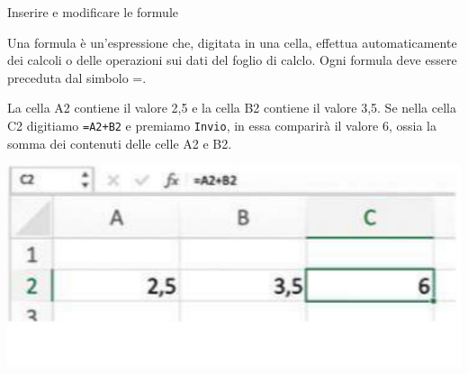 \documentclass[12pt,a4paper,oneside]{book}
\makeatletter
\newcounter{testexample} %
\renewcommand{\subsection}{\@startsection {subsection}{2}{\z@}
{-3ex \@plus -0.1ex \@minus -.4ex}
{0.5ex \@plus.2ex }
{\color[rgb]{0.141,0.596,0.749}\normalfont\sffamily\bfseries}}
\theoremstyle{esercizio}
\makeatother
\begin{document}
\subsection{Inserire e modificare le formule}

\begin{definizione}
Una formula è un'espressione che, digitata in una cella,
 effettua automaticamente dei calcoli o delle operazioni sui dati del 
 foglio di calclo. Ogni formula deve essere preceduta dal simbolo =.
\end{definizione}

















\begin{testexample}

La cella A2 contiene il valore 2,5 e la cella B2 contiene
 il valore 3,5. Se nella cella C2 digitiamo \texttt{=A2+B2} e premiamo \texttt{Invio}, 
 in essa comparirà il valore 6,
 ossia la somma dei contenuti delle celle A2 e B2.

 \begin{minipage}{\linewidth}
	\centering
    \includegraphics[scale=0.4]{path_to_image/inserimento-formula.png} 
    \label{fig:esempioformule}\end{minipage}
\end{testexample}
\end{document}
